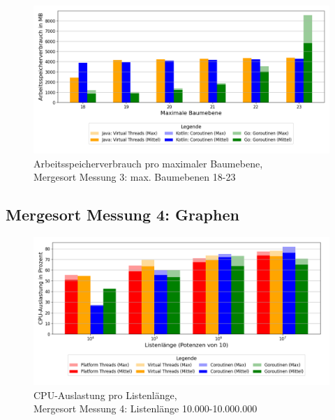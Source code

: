 \documentclass[fontsize=12pt,paper=a4,twoside=semi,parskip=half-,headsepline,headinclude]{scrreprt}
\begin{document}
\begin{figure}[H]
	\centering
	\includegraphics[scale=0.5]{figures/mergesort/Maximalebauebenen1-23_vcg/memory_usage_bar_plot.png}
	\caption{Arbeitsspeicherverbrauch pro maximaler Baumebene,\\ Mergesort Messung 3: max. Baumebenen 18-23}
	\label{fig:ms1-23RAM}
\end{figure}

\subsection{Mergesort Messung 4: Graphen}
\label{subsec:mergsort4graph}

\begin{figure}[H]
	\centering
	\includegraphics[scale=0.5]{figures/mergesort/Listenlaenge/cpu_usage_bar_plot.png}
	\caption{CPU-Auslastung pro Listenlänge,\\ Mergesort Messung 4: Listenlänge 10.000-10.000.000}
	\label{fig:mslaengeCPU}
\end{figure}
\end{document}

